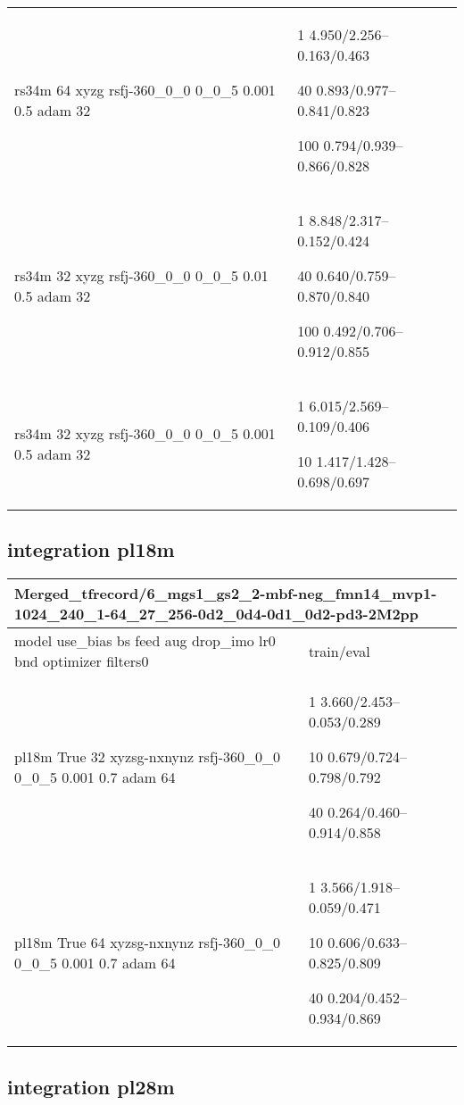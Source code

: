 \documentclass[,table,dvipsnames]{article}
\begin{document}
\begin{tabular}{|p{9cm}|p{6cm}| }
	\rowcolor{yellow!20}
	rs34m 64 xyzg rsfj-360\_0\_0 0\_0\_5 0.001 0.5 adam 32& 1 4.950/2.256--0.163/0.463\par 40 0.893/0.977--0.841/0.823\par 100 0.794/0.939--0.866/0.828\\
	
	\rowcolor{green!20}
	rs34m 32 xyzg rsfj-360\_0\_0 0\_0\_5 0.01 0.5 adam 32&1 8.848/2.317--0.152/0.424\par 40 0.640/0.759--0.870/0.840\par 100 0.492/0.706--0.912/0.855\\
	
	\rowcolor{orange!20}
	rs34m 32 xyzg rsfj-360\_0\_0 0\_0\_5 0.001 0.5 adam 32& 1 6.015/2.569--0.109/0.406\par 10 1.417/1.428--0.698/0.697\\
	\hline 
\end{tabular}

\subsection{integration pl18m}
\noindent\begin{tabular}{|p{9cm}|p{6cm}| }	
	\hline
	\multicolumn{2}{|p{15cm}|}{Merged\_tfrecord/6\_mgs1\_gs2\_2-mbf-neg\_fmn14\_mvp1-1024\_240\_1-64\_27\_256-0d2\_0d4-0d1\_0d2-pd3-2M2pp}\\
	\hline
	model use\_bias bs feed aug drop\_imo lr0 bnd optimizer filters0 & train/eval \\
	
	\rowcolor{yellow!20}
	pl18m True 32 xyzsg-nxnynz rsfj-360\_0\_0 0\_0\_5 0.001 0.7 adam 64 &1 3.660/2.453--0.053/0.289\par  10 0.679/0.724--0.798/0.792\par 40 0.264/0.460--0.914/0.858\\
	
	\rowcolor{green!20}
	pl18m True 64 xyzsg-nxnynz rsfj-360\_0\_0 0\_0\_5 0.001 0.7 adam 64& 1 3.566/1.918--0.059/0.471\par 10 0.606/0.633--0.825/0.809\par 40 0.204/0.452--0.934/0.869\\
	\hline 
\end{tabular}

\subsection{integration pl28m}
\end{document}
